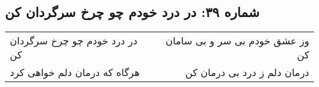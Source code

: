 \begin{center}
\section*{شماره ۳۹: در درد خودم چو چرخ سرگردان کن}
\label{sec:039}
\begin{longtable}{l p{0.5cm} r}
در درد خودم چو چرخ سرگردان کن
&&
وز عشق خودم بی سر و بی سامان کن
\\
هرگاه که درمان دلم خواهی کرد
&&
درمان دلم ز درد بی درمان کن
\\
\end{longtable}
\end{center}
